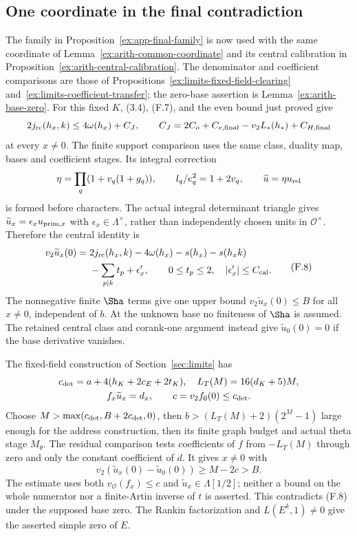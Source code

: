 \subsection{One coordinate in the final contradiction}
The family in Proposition~\ref{ex:app-final-family} is now used with
the same coordinate of Lemma~\ref{ex:arith-common-coordinate}
and its central calibration in
Proposition~\ref{ex:arith-central-calibration}. The denominator and
coefficient comparisons are those of
Propositions~\ref{ex:limits-fixed-field-clearing}
and~\ref{ex:limits-coefficient-transfer}; the zero-base assertion is
Lemma~\ref{ex:arith-base-zero}.
For this fixed $K$, (3.4), (F.7), and the even bound just proved give
\[
 2j_{\rm rc}(h_x,k)\le4\omega(h_x)+C_J,\qquad
 C_J=2C_o+C_{e,\rm final}-v_2L_*(h_*)+C_{H,\rm final}
\]
at every $x\ne0$.
The finite support comparison uses the same class, duality map,
bases and coefficient stages. Its integral correction
\[
 \eta=\prod_q(1+v_q(1+g_q)),\qquad l_q/e_q^2=1+2v_q,
 \qquad \widetilde u=\eta u_{\rm rel}
\]
is formed before characters. The actual integral determinant
triangle gives $\widetilde u_x=\epsilon_xu_{{\rm prim},x}$ with
$\epsilon_x\in\Lambda^\times$, rather than independently chosen
units in $\mathscr O^\times$. Therefore the central identity is
\[
 \begin{split}
 v_2\widetilde u_x(0)={}&2j_{\rm rc}(h_x,k)-4\omega(h_x)
       -s(h_x)-s(h_xk)\\
       &-\sum_{p\mid k}t_p+\epsilon'_x,\qquad
 0\le t_p\le2,\quad |\epsilon'_x|\le C_{\rm cal}.
 \end{split}                                                    \tag{F.8}
\]
The nonnegative finite $\Sha$ terms give one upper bound
$v_2\widetilde u_x(0)\le B$ for all $x\ne0$, independent of $b$.
At the unknown base no finiteness of $\Sha$ is assumed.
The retained central class and corank-one argument instead give
$\widetilde u_0(0)=0$ if the base derivative vanishes.

The fixed-field construction of Section~\ref{sec:limits} has
\[
 \begin{gathered}
 c_{\rm det}=a+4(h_K+2c_E+2t_K),\quad
 L_T(M)=16(d_K+5)M,\\
 f_x\widetilde u_x=d_x,\qquad
 c=v_2f_0(0)\le c_{\rm det}.
 \end{gathered}
\]
Choose $M>\max(c_{\rm det},B+2c_{\rm det},0)$, then
$b>(L_T(M)+2)(2^M-1)$ large enough for the address construction,
then its finite graph budget and actual theta stage $M_\theta$.
The residual comparison tests coefficients of $f$ from
$-L_T(M)$ through zero and only the constant coefficient of $d$.
It gives $x\ne0$ with
\[
       v_2(\widetilde u_x(0)-\widetilde u_0(0))\ge M-2c>B.
\]
The estimate uses both $v_{\mathscr O}(f_x)\le c$ and
$\widetilde u_x\in\Lambda[1/2]$; neither a bound on the whole
numerator nor a finite-Artin inverse of $t$ is asserted.
This contradicts (F.8) under the supposed base zero.
The Rankin factorization and $L(E^k,1)\ne0$ give the asserted
simple zero of $E$.

